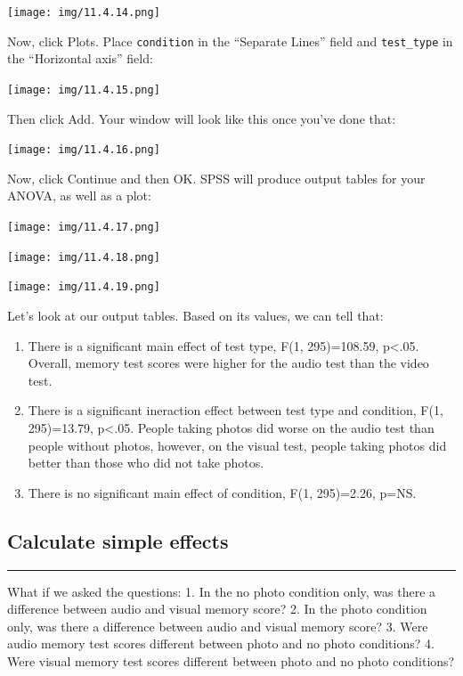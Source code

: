 \documentclass[
]{book}
\begin{document}
\texttt{[image: img/11.4.14.png]}

Now, click {Plots}. Place \texttt{condition} in the ``Separate Lines'' field and \texttt{test\_type} in the ``Horizontal axis'' field:

\texttt{[image: img/11.4.15.png]}

Then click {Add}. Your window will look like this once you've done that:

\texttt{[image: img/11.4.16.png]}

Now, click {Continue} and then {OK}. SPSS will produce output tables for your ANOVA, as well as a plot:

\texttt{[image: img/11.4.17.png]}

\texttt{[image: img/11.4.18.png]}

\texttt{[image: img/11.4.19.png]}

Let's look at our output tables. Based on its values, we can tell that:

\begin{enumerate}
\def\labelenumi{\arabic{enumi}.}
\item
  There is a significant main effect of test type, F(1, 295)=108.59, p\textless.05. Overall, memory test scores were higher for the audio test than the video test.
\item
  There is a significant ineraction effect between test type and condition, F(1, 295)=13.79, p\textless.05. People taking photos did worse on the audio test than people without photos, however, on the visual test, people taking photos did better than those who did not take photos.
\item
  There is no significant main effect of condition, F(1, 295)=2.26, p=NS.
\end{enumerate}

\hypertarget{calculate-simple-effects-2}{%
\subsection{Calculate simple effects}\label{calculate-simple-effects-2}}

\begin{center}\rule{0.5\linewidth}{0.5pt}\end{center}

What if we asked the questions:
1. In the no photo condition only, was there a difference between audio and visual memory score?
2. In the photo condition only, was there a difference between audio and visual memory score?
3. Were audio memory test scores different between photo and no photo conditions?
4. Were visual memory test scores different between photo and no photo conditions?
\end{document}
